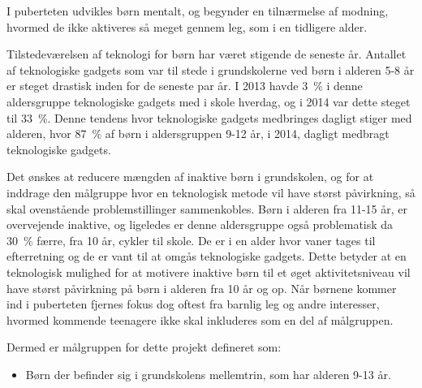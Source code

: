 I puberteten udvikles børn mentalt, og begynder en tilnærmelse af modning, hvormed de ikke aktiveres så meget gennem leg, som i en tidligere alder. \citep{Skovby2014}  

Tilstedeværelsen af teknologi for børn har været stigende de seneste år. Antallet af teknologiske gadgets som var til stede i grundskolerne ved børn i alderen 5-8 år er steget drastisk inden for de seneste par år. I 2013 havde 3~\% i denne aldersgruppe teknologiske gadgets med i skole hverdag, og i 2014 var dette steget til 33~\%. Denne tendens hvor teknologiske gadgets medbringes dagligt stiger med alderen, hvor 87~\% af børn i aldersgruppen 9-12 år, i 2014, dagligt medbragt teknologiske gadgets. \citep{GjensidigeForsikring2014}

Det ønskes at reducere mængden af inaktive børn i grundskolen, og for at inddrage den målgruppe hvor en teknologisk metode vil have størst påvirkning, så skal ovenstående problemstillinger sammenkobles. Børn i alderen fra 11-15 år, er overvejende inaktive, og ligeledes er denne aldersgruppe også problematisk da 30~\% færre, fra 10 år, cykler til skole. De er i en alder hvor vaner tages til efterretning og de er vant til at omgås teknologiske gadgets. Dette betyder at en teknologisk mulighed for at motivere inaktive børn til et øget aktivitetsniveau vil have størst påvirkning på børn i alderen fra 10 år og op. Når børnene kommer ind i puberteten fjernes fokus dog oftest fra barnlig leg og andre interesser, hvormed kommende teenagere ikke skal inkluderes som en del af målgruppen. 

Dermed er målgruppen for dette projekt defineret som: 

\begin{itemize}
\item Børn der befinder sig i grundskolens mellemtrin, som har alderen 9-13 år.
\end{itemize}